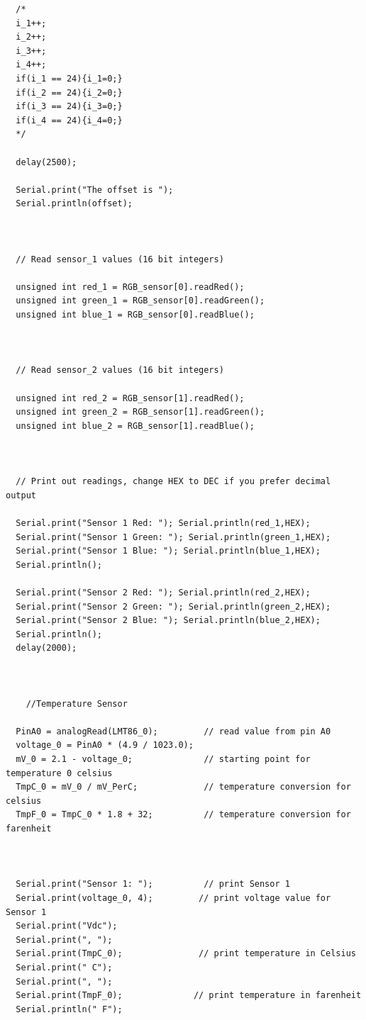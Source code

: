 \documentclass[12pt,a4paper]{report}
\begin{document}
\begin{lstlisting}
  /*
  i_1++;
  i_2++;
  i_3++;
  i_4++;
  if(i_1 == 24){i_1=0;}
  if(i_2 == 24){i_2=0;}
  if(i_3 == 24){i_3=0;}
  if(i_4 == 24){i_4=0;}
  */ 

  delay(2500);

  Serial.print("The offset is ");
  Serial.println(offset);



  // Read sensor_1 values (16 bit integers)

  unsigned int red_1 = RGB_sensor[0].readRed();
  unsigned int green_1 = RGB_sensor[0].readGreen();
  unsigned int blue_1 = RGB_sensor[0].readBlue();



  // Read sensor_2 values (16 bit integers)

  unsigned int red_2 = RGB_sensor[1].readRed();
  unsigned int green_2 = RGB_sensor[1].readGreen();
  unsigned int blue_2 = RGB_sensor[1].readBlue();

  

  // Print out readings, change HEX to DEC if you prefer decimal output

  Serial.print("Sensor 1 Red: "); Serial.println(red_1,HEX);
  Serial.print("Sensor 1 Green: "); Serial.println(green_1,HEX);
  Serial.print("Sensor 1 Blue: "); Serial.println(blue_1,HEX);
  Serial.println();

  Serial.print("Sensor 2 Red: "); Serial.println(red_2,HEX);
  Serial.print("Sensor 2 Green: "); Serial.println(green_2,HEX);
  Serial.print("Sensor 2 Blue: "); Serial.println(blue_2,HEX);
  Serial.println();
  delay(2000);



    //Temperature Sensor

  PinA0 = analogRead(LMT86_0);         // read value from pin A0  
  voltage_0 = PinA0 * (4.9 / 1023.0);
  mV_0 = 2.1 - voltage_0;              // starting point for temperature 0 celsius 
  TmpC_0 = mV_0 / mV_PerC;             // temperature conversion for celsius 
  TmpF_0 = TmpC_0 * 1.8 + 32;          // temperature conversion for farenheit 



  Serial.print("Sensor 1: ");          // print Sensor 1 
  Serial.print(voltage_0, 4);         // print voltage value for Sensor 1 
  Serial.print("Vdc");              
  Serial.print(", ");
  Serial.print(TmpC_0);               // print temperature in Celsius 
  Serial.print(" C"); 
  Serial.print(", ");
  Serial.print(TmpF_0);              // print temperature in farenheit 
  Serial.println(" F");
  

\end{lstlisting}
\end{document}
